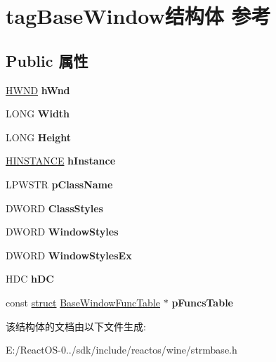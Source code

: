 \hypertarget{structtag_base_window}{}\section{tag\+Base\+Window结构体 参考}
\label{structtag_base_window}
\subsection*{Public 属性}
\begin{DoxyCompactItemize}
\item 
\mbox{\label{structtag_base_window_af089e1f87d3f77a3aec326a9ca731065}} 
\hyperlink{interfacevoid}{H\+W\+ND} {\bfseries h\+Wnd}
\item 
\mbox{\label{structtag_base_window_a771e05ab16f12ee3002c1db8e429cb5f}} 
L\+O\+NG {\bfseries Width}
\item 
\mbox{\label{structtag_base_window_a515da0b244fb480a24b98d5c7fab7d42}} 
L\+O\+NG {\bfseries Height}
\item 
\mbox{\label{structtag_base_window_a60a332f629a0ca4d043db9ecd643cb6f}} 
\hyperlink{interfacevoid}{H\+I\+N\+S\+T\+A\+N\+CE} {\bfseries h\+Instance}
\item 
\mbox{\label{structtag_base_window_a00f7fbd16e45750dc1fb4ce6064b8e38}} 
L\+P\+W\+S\+TR {\bfseries p\+Class\+Name}
\item 
\mbox{\label{structtag_base_window_a7b0a38dc5f2b137b8cf94866d1b61f9b}} 
D\+W\+O\+RD {\bfseries Class\+Styles}
\item 
\mbox{\label{structtag_base_window_a1b431bf5440235ec0dcc6f5923d10cd5}} 
D\+W\+O\+RD {\bfseries Window\+Styles}
\item 
\mbox{\label{structtag_base_window_a72a086180de207f2f8a1f88fcdd58bbf}} 
D\+W\+O\+RD {\bfseries Window\+Styles\+Ex}
\item 
\mbox{\label{structtag_base_window_a6a3b0f8ee1ff00efb60caf06fbde8e53}} 
H\+DC {\bfseries h\+DC}
\item 
\mbox{\label{structtag_base_window_a68428550a208c4a80d44f21f10cbaeb8}} 
const \hyperlink{interfacestruct}{struct} \hyperlink{struct_base_window_func_table}{Base\+Window\+Func\+Table} $\ast$ {\bfseries p\+Funcs\+Table}
\end{DoxyCompactItemize}


该结构体的文档由以下文件生成\+:\begin{DoxyCompactItemize}
\item 
E\+:/\+React\+O\+S-\/0../sdk/include/reactos/wine/strmbase.\+h\end{DoxyCompactItemize}
